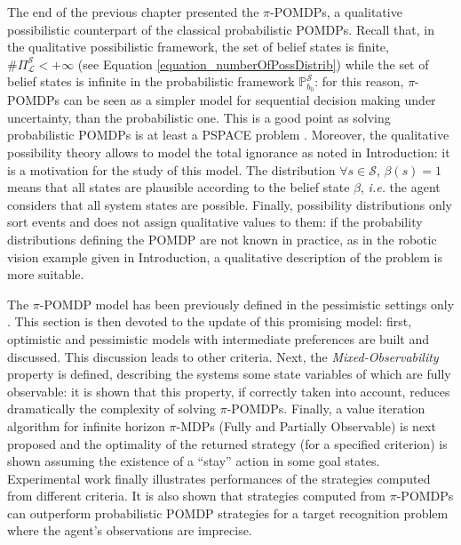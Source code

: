 The end of the previous chapter presented the $\pi$-POMDPs, 
a qualitative possibilistic counterpart of the classical probabilistic POMDPs.
Recall that, in the qualitative possibilistic framework, the set of belief states is finite, 
$\# \Pi^{\mathcal{S}}_{\mathcal{L}} < +\infty$ (see Equation \ref{equation_numberOfPossDistrib})
while the set of belief states is infinite in the probabilistic framework $\mathbb{P}^{\mathcal{S}}_{b_0}$:
for this reason, $\pi$-POMDPs can be seen as a simpler model 
for sequential decision making under uncertainty,
than the probabilistic one. This is a good point as solving probabilistic POMDPs 
is at least a PSPACE problem \cite{Papadimitriou:1987,Madani:1999:UPP:315149.315395}.
Moreover, the qualitative possibility theory allows to model the total ignorance
as noted in Introduction: it is a motivation for the study of this model.
The distribution $\forall s \in \mathcal{S}$, $\beta(s) = 1$ means that all
states are plausible according to the belief state $\beta$, \textit{i.e.} 
the agent considers that all system states are possible. 
Finally, possibility distributions only sort events and does not assign qualitative values to them: 
if the probability distributions defining the POMDP are not known in practice,
as in the robotic vision example given in Introduction,
a qualitative description of the problem is more suitable.

The $\pi$-POMDP model has been previously defined in the pessimistic settings only \cite{Sabbadin:1999:pipomdp}.
This section is then devoted to the update of this promising model:
first, optimistic and pessimistic models 
with intermediate preferences are built and discussed.
This discussion leads to other criteria.
Next, the \textit{Mixed-Observability} property \cite{OngShaoHsuWee-IJRR10,AraThoBufCha-ICTAI10} 
is defined, describing the systems some state variables 
of which are fully observable:
it is shown that this property, if correctly taken into account,
reduces dramatically the complexity of solving $\pi$-POMDPs.
Finally, a value iteration algorithm for infinite horizon 
$\pi$-MDPs (Fully and Partially Observable) 
is next proposed and the optimality of the returned strategy (for a specified criterion) 
is shown assuming the existence of a ``stay'' action in some goal states.
Experimental work finally 
illustrates performances of the strategies 
computed from different criteria. 
It is also shown that strategies computed 
from $\pi$-POMDPs can
outperform probabilistic POMDP strategies 
for a target recognition problem 
where the agent's observations are imprecise. 

